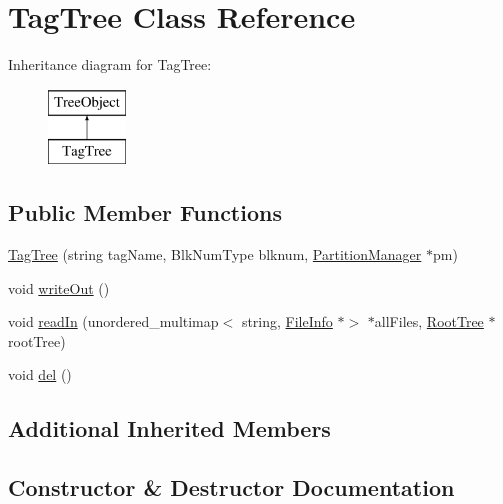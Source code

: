 \hypertarget{classTagTree}{}\section{Tag\+Tree Class Reference}
\label{classTagTree}
Inheritance diagram for Tag\+Tree\+:\begin{figure}[H]
\begin{center}
\leavevmode
\includegraphics[height=2.000000cm]{classTagTree}
\end{center}
\end{figure}
\subsection*{Public Member Functions}
\begin{DoxyCompactItemize}
\item 
\mbox{\hyperlink{classTagTree_a80b23fa47a18727a248c3db1e8b2ed83}{Tag\+Tree}} (string tag\+Name, Blk\+Num\+Type blknum, \mbox{\hyperlink{classPartitionManager}{Partition\+Manager}} $\ast$pm)
\item 
void \mbox{\hyperlink{classTagTree_ae316c2517c607547f02ce43b63a6316d}{write\+Out}} ()
\item 
void \mbox{\hyperlink{classTagTree_a2e72921ccc19667331c64d3d0100b269}{read\+In}} (unordered\+\_\+multimap$<$ string, \mbox{\hyperlink{classFileInfo}{File\+Info}} $\ast$$>$ $\ast$all\+Files, \mbox{\hyperlink{classRootTree}{Root\+Tree}} $\ast$root\+Tree)
\item 
void \mbox{\hyperlink{classTagTree_ad8108969f4d28b938e55c8339f19db35}{del}} ()
\end{DoxyCompactItemize}
\subsection*{Additional Inherited Members}


\subsection{Constructor \& Destructor Documentation}
\mbox{\label{classTagTree_a80b23fa47a18727a248c3db1e8b2ed83}} 
